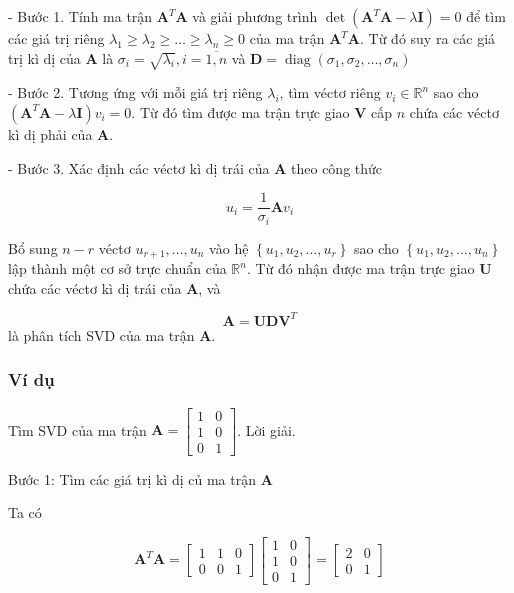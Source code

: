\documentclass[12pt,a4paper,oneside]{report}
\numberwithin{equation}{section}
\begin{document}
- Bước 1. Tính ma trận $\mathbf{A}^{T} \mathbf{A}$ và giải phương trình $\operatorname{det}\left(\mathbf{A}^{T} \mathbf{A}-\lambda \mathbf{I}\right)=0$ để tìm các giá trị riêng $\lambda_{1} \geq \lambda_{2} \geq \ldots \geq \lambda_{n} \geq 0$ của ma trận $\mathbf{A}^{T} \mathbf{A}$. Từ đó suy ra các giá trị kì dị của $\mathbf{A}$ là $\sigma_{i}=\sqrt{\lambda_{i}}, i=\overline{1, n}$ và $\mathbf{D}=\operatorname{diag}\left(\sigma_{1}, \sigma_{2}, \ldots, \sigma_{n}\right)$

- Bước 2. Tương ứng với mỗi giá trị riêng $\lambda_{i}$, tìm véctơ riêng $v_{i} \in \mathbb{R}^{n}$ sao cho $\left(\mathbf{A}^{T} \mathbf{A}-\lambda \mathbf{I}\right) v_{i}=0$. Từ đó tìm được ma trận trực giao $\mathbf{V}$ cấp $n$ chứa các véctơ kì dị phải của $\mathbf{A}$.

- Bước 3. Xác định các véctơ kì dị trái của $\mathbf{A}$ theo công thức

$$
u_{i}=\frac{1}{\sigma_{i}} \mathbf{A} v_{i}
$$

Bổ sung $n-r$ véctơ $u_{r+1}, \ldots, u_{n}$ vào hệ $\left\{u_{1}, u_{2}, \ldots, u_{r}\right\}$ sao cho $\left\{u_{1}, u_{2}, \ldots, u_{n}\right\}$ lập thành một cơ sở trực chuẩn của $\mathbb{R}^{n}$. Từ đó nhận được ma trận trực giao $\mathbf{U}$ chứa các véctơ kì dị trái của $\mathbf{A}$, và

$$
\mathbf{A}=\mathbf{U D V}^{T}
$$
là phân tích SVD của ma trận $\mathbf{A}$.

\subsubsection{Ví dụ}

Tìm SVD của ma trận $\mathbf{A}=\left[\begin{array}{ll}1 & 0 \\ 1 & 0 \\ 0 & 1\end{array}\right]$. Lời giải.

Bước 1: Tìm các giá trị kì dị củ ma trận $\mathbf{A}$

Ta có

$$
\mathbf{A}^{T} \mathbf{A}=\left[\begin{array}{lll}
	1 & 1 & 0 \\
	0 & 0 & 1
\end{array}\right]\left[\begin{array}{ll}
	1 & 0 \\
	1 & 0 \\
	0 & 1
\end{array}\right]=\left[\begin{array}{ll}
	2 & 0 \\
	0 & 1
\end{array}\right]
$$
\end{document}
